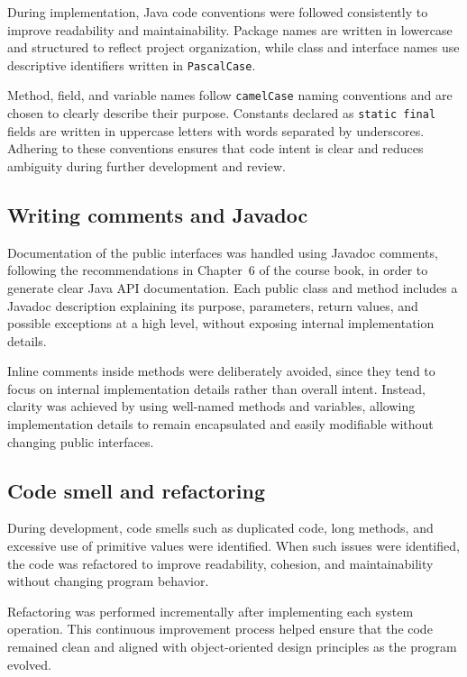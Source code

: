 \documentclass[a4paper]{scrartcl}
\begin{document}
During implementation, Java code conventions were followed consistently to improve readability and maintainability. Package names are written in lowercase and structured to reflect project organization, while class and interface names use descriptive identifiers written in \texttt{PascalCase}.

Method, field, and variable names follow \texttt{camelCase} naming conventions and are chosen to clearly describe their purpose. Constants declared as \texttt{static final} fields are written in uppercase letters with words separated by underscores. Adhering to these conventions ensures that code intent is clear and reduces ambiguity during further development and review.

\subsection{Writing comments and Javadoc}

Documentation of the public interfaces was handled using Javadoc comments, following the
recommendations in Chapter~6 of the course book, in order to generate clear Java API documentation. Each public class and method includes a Javadoc description explaining its purpose, parameters, return values, and possible exceptions at a high level, without exposing internal implementation details.

Inline comments inside methods were deliberately avoided, since they tend to focus on internal implementation details rather than overall intent. Instead, clarity was achieved by using well-named methods and variables, allowing implementation details to remain encapsulated and easily modifiable without changing public interfaces.

\subsection{Code smell and refactoring}

During development, code smells such as duplicated code, long methods, and excessive use of primitive values were identified. When such issues were identified, the code was refactored to improve readability, cohesion, and maintainability without changing program behavior.

Refactoring was performed incrementally after implementing each system operation. This
continuous improvement process helped ensure that the code remained clean and aligned with
object-oriented design principles as the program evolved.
\end{document}
